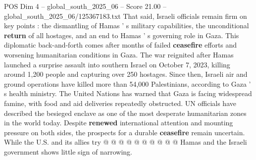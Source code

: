 \begin{textsample}{POS Dim 4 – global\_south\_2025\_06 – Score 21.00 – global\_south\_2025\_06/125367183.txt}
That said, Israeli officials remain firm on key points : the dismantling of Hamas ' s military capabilities, the unconditional \textbf{return} of all hostages, and an end to Hamas ' s governing role in Gaza.
This diplomatic back-and-forth comes after months of failed \textbf{ceasefire} efforts and worsening humanitarian conditions in Gaza.
The war reignited after Hamas launched a surprise assault into southern Israel on October 7, 2023, killing around 1,200 people and capturing over 250 hostages.
Since then, Israeli air and ground operations have killed more than 54,000 Palestinians, according to Gaza ' s health ministry.
The United Nations has warned that Gaza is facing widespread famine, with food and aid deliveries repeatedly obstructed.
UN officials have described the besieged enclave as one of the most desperate humanitarian zones in the world today.
Despite \textbf{renewed} international attention and mounting pressure on both sides, the prospects for a durable \textbf{ceasefire} remain uncertain.
While the U.S. and its allies try @ @ @ @ @ @ @ @ @ @ Hamas and the Israeli government shows little sign of narrowing.

\end{textsample}
